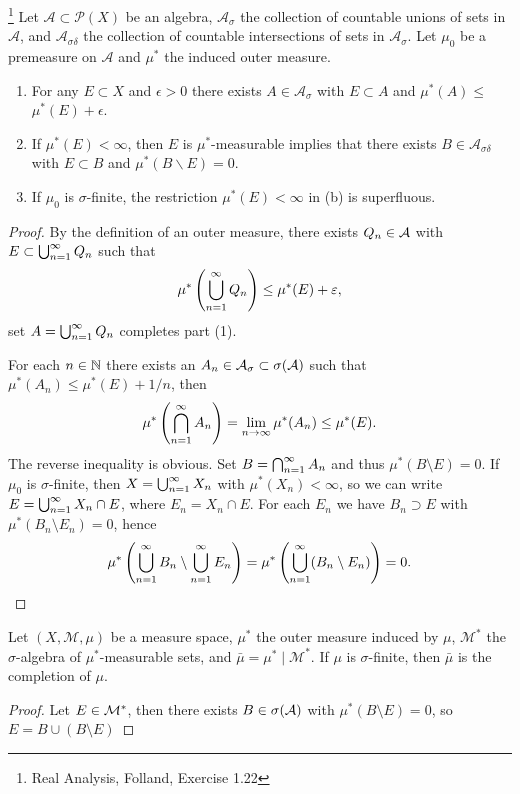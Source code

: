 \begin{exercise}\footnote{Real Analysis, Folland, Exercise 1.22}\label{ex1-22}
    Let $\mathcal{A} \subset \mathcal{P}(X)$ be an algebra, $\mathcal{A}_\sigma$ the collection of countable unions of sets in $\mathcal{A}$, and $\mathcal{A}_{\sigma \delta}$ the collection of countable intersections of sets in $\mathcal{A}_\sigma$. Let $\mu_0$ be a premeasure on $\mathcal{A}$ and $\mu^*$ the induced outer measure.
    \begin{enumerate}
    \item For any $E \subset X$ and $\epsilon>0$ there exists $A \in \mathcal{A}_\sigma$ with $E \subset A$ and $\mu^*(A) \leq$ $\mu^*(E)+\epsilon$.
    \item If $\mu^*(E)<\infty$, then $E$ is $\mu^*$-measurable implies that there exists $B \in \mathcal{A}_{\sigma \delta}$ with $E \subset B$ and $\mu^*(B \backslash E)=0$.
    \item If $\mu_0$ is $\sigma$-finite, the restriction $\mu^*(E)<\infty$ in (b) is superfluous. 
    \end{enumerate}
\end{exercise}
\begin{proof}
    By the definition of an outer measure, there exists $Q_n \in \mathcal{A}$ with $E \subset \bigcup_{n=1}^{\infty}Q_n$ such that 
    $$\mu^*\left(\bigcup_{n=1}^{\infty}Q_n\right) \leq \mu^*(E) + \varepsilon, $$
    set $A = \bigcup_{n=1}^{\infty}Q_n$ completes part (1). 

    For each $n \in \mathbb{N}$ there exists an $A_n \in \mathcal{A}_\sigma \subset \sigma(\mathcal{A})$ such that 
    $\mu^*(A_n) \leq \mu^*(E) + 1/n$,
    then 
    $$\mu^*\left(\bigcap_{n=1}^{\infty}A_n\right)
    = \lim_{n \to \infty}\mu^*(A_n) \leq \mu^*(E).$$
    The reverse inequality is obvious. Set $B = \bigcap_{n=1}^{\infty}A_n$ and thus $\mu^*(B \setminus E) = 0$. 
    If $\mu_0$ is $\sigma$-finite, then $X = \bigcup_{n=1}^{\infty}X_n$ with $\mu^*(X_n) < \infty$, so we can write 
    $E = \bigcup_{n=1}^{\infty}X_n \cap E$, where $E_n = X_n \cap E$. For each $E_n$ we have $B_n \supset E$ with $\mu^*(B_n \setminus E_n) = 0$, hence 
    $$\mu^*\left(\bigcup_{n=1}^{\infty}B_n \setminus \bigcup_{n=1}^{\infty}E_n\right) = 
    \mu^*\left(\bigcup_{n=1}^{\infty}(B_n \setminus E_n)\right) = 0.$$
\end{proof}

\begin{exercise}
    Let $(X, \mathcal{M}, \mu)$ be a measure space, $\mu^*$ the outer measure induced by $\mu$, $\mathcal{M}^*$ the $\sigma$-algebra of $\mu^*$-measurable sets, and $\bar{\mu}=\mu^* \mid \mathcal{M}^*$.
    If $\mu$ is $\sigma$-finite, then $\bar{\mu}$ is the completion of $\mu$.
\end{exercise}
\begin{proof}
    Let $E \in \mathcal{M}^*$, then there exists $B \in \sigma(\mathcal{A})$ with $\mu^*(B \setminus E) = 0$, so $E = B \cup (B \setminus E)$
\end{proof}

